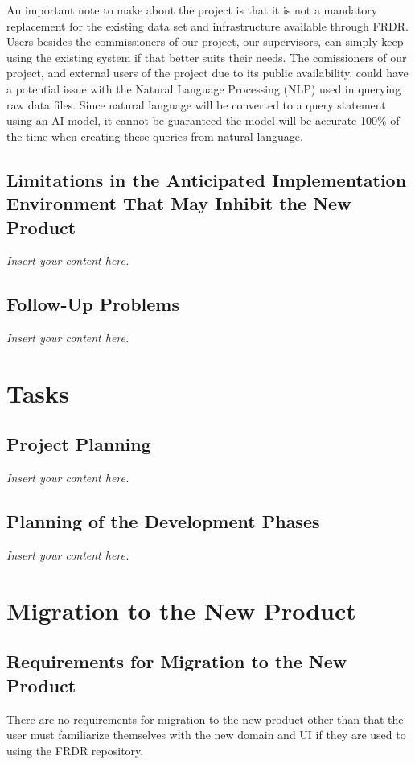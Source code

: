 \documentclass[12pt]{article}
\newcommand{\lips}{\textit{Insert your content here.}}
\begin{document}
\par{An important note to make about the project is that it is not a mandatory replacement for the existing data set and infrastructure 
available through FRDR. Users besides the commissioners of our project, our supervisors, can simply keep using the existing system 
if that better suits their needs. \newline \indent The comissioners of our project, and external users of the project due to its public 
availability, could have a potential issue with the Natural Language Processing (NLP) used in querying raw data files. Since natural language 
will be converted to a query statement using an AI model, it cannot be guaranteed the model will be accurate 100\% of the time when 
creating these queries from natural language.}

\subsection{Limitations in the Anticipated Implementation Environment That May
Inhibit the New Product}
\lips
\subsection{Follow-Up Problems}
\lips

\section{Tasks}
\subsection{Project Planning}
\lips
\subsection{Planning of the Development Phases}
\lips

\section{Migration to the New Product}
\subsection{Requirements for Migration to the New Product}

\par{There are no requirements for migration to the new product other than that the user must familiarize themselves with the new domain and UI if they are used to using the FRDR repository.}
\end{document}
